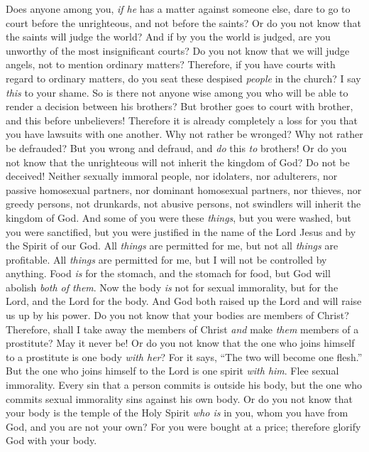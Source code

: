 \begin{biblechapter} %
 Does anyone among you, \textit{if he} has a matter against someone else, dare to go to court before the unrighteous, and not before the saints?
\verse Or do you not know that the saints will judge the world? And if by you the world is judged, are you unworthy of the most insignificant courts?
\verse Do you not know that we will judge angels, not to mention ordinary matters?
\verse Therefore, if you have courts with regard to ordinary matters, do you seat these despised \textit{people} in the church?
\verse I say \textit{this} to your shame. So is there not anyone wise among you who will be able to render a decision between his brothers?
\verse But brother goes to court with brother, and this before unbelievers!
\verse Therefore it is already completely a loss for you that you have lawsuits with one another. Why not rather be wronged? Why not rather be defrauded?
\verse But you wrong and defraud, and \textit{do} this \textit{to} brothers!
\verse Or do you not know that the unrighteous will not inherit the kingdom of God? Do not be deceived! Neither sexually immoral people, nor idolaters, nor adulterers, nor passive homosexual partners, nor dominant homosexual partners,
\verse nor thieves, nor greedy persons, not drunkards, not abusive persons, not swindlers will inherit the kingdom of God.
\verse And some of you were these \textit{things}, but you were washed, but you were sanctified, but you were justified in the name of the Lord Jesus and by the Spirit of our God.
 All \textit{things} are permitted for me, but not all \textit{things} are profitable. All \textit{things} are permitted for me, but I will not be controlled by anything.
\verse Food \textit{is} for the stomach, and the stomach for food, but God will abolish \textit{both of them}. Now the body \textit{is} not for sexual immorality, but for the Lord, and the Lord for the body.
\verse And God both raised up the Lord and will raise us up by his power.
\verse Do you not know that your bodies are members of Christ? Therefore, shall I take away the members of Christ \textit{and} make \textit{them} members of a prostitute? May it never be!
\verse Or do you not know that the one who joins himself to a prostitute is one body \textit{with her}? For it says, “The two will become one flesh.”
\verse But the one who joins himself to the Lord is one spirit \textit{with him}.
\verse Flee sexual immorality. Every sin that a person commits is outside his body, but the one who commits sexual immorality sins against his own body.
\verse Or do you not know that your body is the temple of the Holy Spirit \textit{who is} in you, whom you have from God, and you are not your own?
\verse For you were bought at a price; therefore glorify God with your body.
\end{biblechapter}

